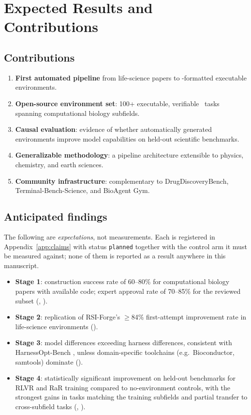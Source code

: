 \section{Expected Results and Contributions}
\label{sec:expected}

\subsection{Contributions}

\begin{enumerate}
  \item \textbf{First automated pipeline} from life-science papers to
        \harbor-formatted executable environments.
  \item \textbf{Open-source environment set}: 100+ executable, verifiable
        \harbor\ tasks spanning computational biology subfields.
  \item \textbf{Causal evaluation}: evidence of whether automatically generated
        environments improve model capabilities on held-out scientific
        benchmarks.
  \item \textbf{Generalizable methodology}: a pipeline architecture extensible
        to physics, chemistry, and earth sciences.
  \item \textbf{Community infrastructure}: complementary to DrugDiscoveryBench,
        Terminal-Bench-Science, and BioAgent Gym.
\end{enumerate}

\subsection{Anticipated findings}

The following are \emph{expectations}, not measurements. Each is registered in
Appendix~\ref{app:claims} with status \texttt{planned} together with the control
arm it must be measured against; none of them is reported as a result anywhere
in this manuscript.

\begin{itemize}
  \item \textbf{Stage 1}: construction success rate of 60--80\% for
        computational biology papers with available code; expert approval rate
        of 70--85\% for the reviewed subset (, ).
  \item \textbf{Stage 2}: replication of RSI-Forge's $\geq$84\% first-attempt
        improvement rate in life-science environments ().
  \item \textbf{Stage 3}: model differences exceeding harness differences,
        consistent with HarnessOpt-Bench \cite{harnessoptbench}, unless
        domain-specific toolchains (e.g.\ Bioconductor, samtools) dominate
        ().
  \item \textbf{Stage 4}: statistically significant improvement on held-out
        benchmarks for RLVR and RaR training compared to no-environment
        controls, with the strongest gains in tasks matching the training
        subfields and partial transfer to cross-subfield tasks (,
        ).
\end{itemize}
